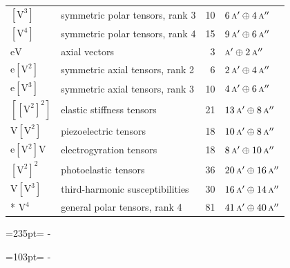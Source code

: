 \documentclass[10pt,a4paper]{article}
\newcommand{\needspace}[1]{\par\penalty-100\begingroup\dimen0=#1\relax\dimen2=\pagegoal
  \advance\dimen2-\pagetotal\ifdim\dimen0>\dimen2\relax\ifdim\dimen2>0pt\vfil\break\fi\fi
  \endgroup}
\numberwithin{equation}{section}
\newcommand{\irr}[1]{\text{\normalfont\scshape #1}}
\newcommand{\jahn}[1]{\mathrm{#1}}
\newlength{\fillwidth}\newlength{\cellwidth}\newlength{\colwidth}
\begin{document}
{\begin{longtable}{@{}llr>{\RaggedRight\arraybackslash}p{\fillwidth}@{}}
$\jahn{[V^{3}]}$ & symmetric polar tensors, rank 3 & 10 & $6\,\irr{a}' \oplus\allowbreak 4\,\irr{a}''$\\
$\jahn{[V^{4}]}$ & symmetric polar tensors, rank 4 & 15 & $9\,\irr{a}' \oplus\allowbreak 6\,\irr{a}''$\\
$\jahn{eV}$ & axial vectors & 3 & $\irr{a}' \oplus\allowbreak 2\,\irr{a}''$\\
$\jahn{e[V^{2}]}$ & symmetric axial tensors, rank 2 & 6 & $2\,\irr{a}' \oplus\allowbreak 4\,\irr{a}''$\\
$\jahn{e[V^{3}]}$ & symmetric axial tensors, rank 3 & 10 & $4\,\irr{a}' \oplus\allowbreak 6\,\irr{a}''$\\
$\jahn{[[V^{2}]^{2}]}$ & elastic stiffness tensors & 21 & $13\,\irr{a}' \oplus\allowbreak 8\,\irr{a}''$\\
$\jahn{V[V^{2}]}$ & piezoelectric tensors & 18 & $10\,\irr{a}' \oplus\allowbreak 8\,\irr{a}''$\\
$\jahn{e[V^{2}]V}$ & electrogyration tensors & 18 & $8\,\irr{a}' \oplus\allowbreak 10\,\irr{a}''$\\
$\jahn{[V^{2}]^{2}}$ & photoelastic tensors & 36 & $20\,\irr{a}' \oplus\allowbreak 16\,\irr{a}''$\\
$\jahn{V[V^{3}]}$ & third-harmonic susceptibilities & 30 & $16\,\irr{a}' \oplus\allowbreak 14\,\irr{a}''$\\*
$\jahn{V^{4}}$ & general polar tensors, rank 4 & 81 & $41\,\irr{a}' \oplus\allowbreak 40\,\irr{a}''$\\
\bottomrule\end{longtable}}
\needspace{235pt}
\needspace{103pt}
\end{document}
